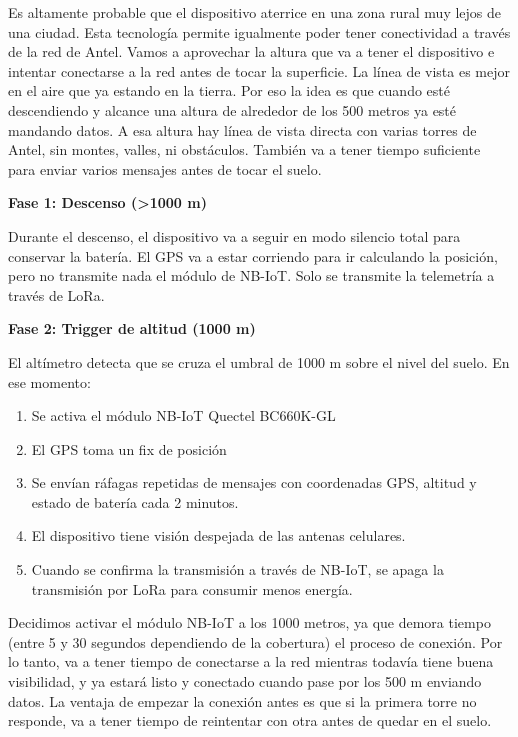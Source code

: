 \documentclass[12pt,a4paper]{article}
\begin{document}
Es altamente probable que el dispositivo aterrice en una zona rural muy lejos de una ciudad. Esta tecnología permite igualmente poder tener conectividad a través de la red de Antel. Vamos a aprovechar la altura que va a tener el dispositivo e intentar conectarse a la red antes de tocar la superficie. La línea de vista es mejor en el aire que ya estando en la tierra. Por eso la idea es que cuando esté descendiendo y alcance una altura de alrededor de los 500 metros ya esté mandando datos. A esa altura hay línea de vista directa con varias torres de Antel, sin montes, valles, ni obstáculos. También va a tener tiempo suficiente para enviar varios mensajes antes de tocar el suelo.

\textbf{Fase 1: Descenso (\textgreater1000 m)}

Durante el descenso, el dispositivo va a seguir en modo silencio total para conservar la batería. El GPS va a estar corriendo para ir calculando la posición, pero no transmite nada el módulo de NB-IoT. Solo se transmite la telemetría a través de LoRa.

\textbf{Fase 2: Trigger de altitud (1000 m)}

El altímetro detecta que se cruza el umbral de 1000 m sobre el nivel del suelo. En ese momento:

\begin{enumerate}
\def\labelenumi{\arabic{enumi}.}
\item
  Se activa el módulo NB-IoT Quectel BC660K-GL
\item
  El GPS toma un fix de posición
\item
  Se envían ráfagas repetidas de mensajes con coordenadas GPS, altitud y estado de batería cada 2 minutos.
\item
  El dispositivo tiene visión despejada de las antenas celulares.
\item
  Cuando se confirma la transmisión a través de NB-IoT, se apaga la transmisión por LoRa para consumir menos energía.
\end{enumerate}

Decidimos activar el módulo NB-IoT a los 1000 metros, ya que demora tiempo (entre 5 y 30 segundos dependiendo de la cobertura) el proceso de conexión. Por lo tanto, va a tener tiempo de conectarse a la red mientras todavía tiene buena visibilidad, y ya estará listo y conectado cuando pase por los 500 m enviando datos. La ventaja de empezar la conexión antes es que si la primera torre no responde, va a tener tiempo de reintentar con otra antes de quedar en el suelo.
\end{document}
